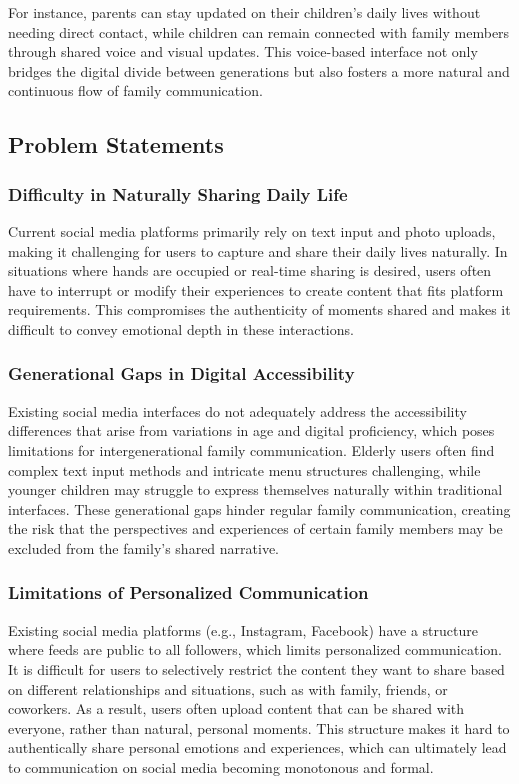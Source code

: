 \documentclass[conference]{IEEEtran}
\begin{document}
    For instance, parents can stay updated on their children's daily lives without needing direct contact, while children can remain connected with family members through shared voice and visual updates. This voice-based interface not only bridges the digital divide between generations but also fosters a more natural and continuous flow of family communication.

    \subsection{Problem Statements}
        \subsubsection{Difficulty in Naturally Sharing Daily Life}
        Current social media platforms primarily rely on text input and photo uploads, making it challenging for users to capture and share their daily lives naturally. In situations where hands are occupied or real-time sharing is desired, users often have to interrupt or modify their experiences to create content that fits platform requirements. This compromises the authenticity of moments shared and makes it difficult to convey emotional depth in these interactions.
        
        \subsubsection{Generational Gaps in Digital Accessibility}
        Existing social media interfaces do not adequately address the accessibility differences that arise from variations in age and digital proficiency, which poses limitations for intergenerational family communication. Elderly users often find complex text input methods and intricate menu structures challenging, while younger children may struggle to express themselves naturally within traditional interfaces. These generational gaps hinder regular family communication, creating the risk that the perspectives and experiences of certain family members may be excluded from the family's shared narrative.
        
        \subsubsection{Limitations of Personalized Communication}

 Existing social media platforms (e.g., Instagram, Facebook) have a structure where feeds are public to all followers, which limits personalized communication. It is difficult for users to selectively restrict the content they want to share based on different relationships and situations, such as with family, friends, or coworkers. As a result, users often upload content that can be shared with everyone, rather than natural, personal moments. This structure makes it hard to authentically share personal emotions and experiences, which can ultimately lead to communication on social media becoming monotonous and formal.
\end{document}
